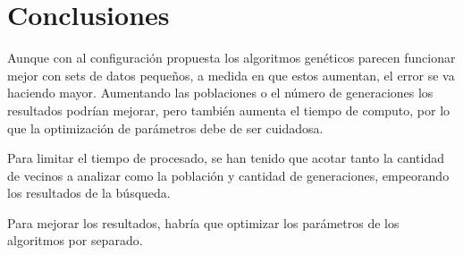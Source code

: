 \documentclass[10pt,a4paper]{article}
\begin{document}
\section{Conclusiones}
Aunque con al configuración propuesta los algoritmos genéticos parecen funcionar mejor con sets de datos pequeños, a medida en que estos aumentan, el error se va haciendo mayor. Aumentando las poblaciones o el número de generaciones los resultados podrían mejorar, pero también aumenta el tiempo de computo, por lo que la optimización de parámetros debe de ser cuidadosa.

Para limitar el tiempo de procesado, se han tenido que acotar tanto la cantidad de vecinos a analizar como la población y cantidad de generaciones, empeorando los resultados de la búsqueda.

Para mejorar los resultados, habría que optimizar los parámetros de los algoritmos por separado.
\end{document}
